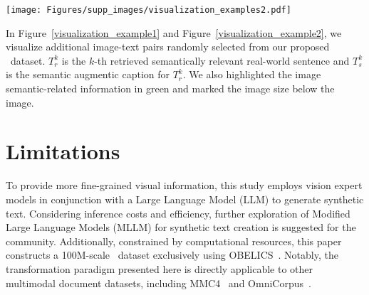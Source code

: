 \begin{figure*}[t]
    \centering
    \texttt{[image: Figures/supp\_images/visualization\_examples2.pdf]}
    \vspace{-8mm}
    \caption{Visualization of image-text pairs in our proposed \dsname\ dataset. $T^{k}_{r}$: the $k$-th retrieved realistic text. $T^{k}_{s}$: the image semantic augmented synthetic text for $T^{k}_{r}$. Image semantic-related information is highlighted in \textcolor{fig2_green}{green}.}
    \label{visualization_example2}
\end{figure*}

In Figure~\ref{visualization_example1} and Figure~\ref{visualization_example2}, we visualize additional image-text pairs randomly selected from our proposed \dsname\ dataset. $T^{k}_{r}$ is the $k$-th retrieved semantically relevant real-world sentence and $T^{k}_{s}$ is the semantic augmentic caption for $T^{k}_{r}$. We also highlighted the image semantic-related information in \textcolor{fig2_green}{green} and marked the image size below the image. 


\section{Limitations}
\label{sec: limitation}
To provide more fine-grained visual information, this study employs vision expert models in conjunction with a Large Language Model (LLM) to generate synthetic text. Considering inference costs and efficiency, further exploration of Modified Large Language Models (MLLM) for synthetic text creation is suggested for the community. Additionally, constrained by computational resources, this paper constructs a 100M-scale \dsname\ dataset exclusively using OBELICS~\cite{Obelics}. Notably, the transformation paradigm presented here is directly applicable to other multimodal document datasets, including MMC4~\cite{MMC4} and OmniCorpus~\cite{omnicorpus}.